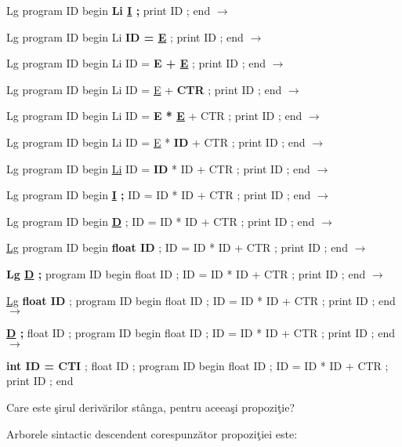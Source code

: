 Lg program ID begin \textbf{Li \underline{I} ;} print ID ; end $\rightarrow$

Lg program ID begin Li \textbf{ID = \underline{E}} ; print ID ; end $\rightarrow$

Lg program ID begin Li ID = \textbf{E + \underline{E}} ; print ID ; end $\rightarrow$

Lg program ID begin Li ID = \underline{E} + \textbf{CTR} ; print ID ; end $\rightarrow$

Lg program ID begin Li ID = \textbf{E * \underline{E}} + CTR ; print ID ; end $\rightarrow$

Lg program ID begin Li ID = \underline{E} * \textbf{ID} + CTR ; print ID ; end $\rightarrow$

Lg program ID begin \underline{Li} ID = \textbf{ID} * ID + CTR ; print ID ; end $\rightarrow$

Lg program ID begin \textbf{\underline{I} ;} ID = ID * ID + CTR ; print ID ; end $\rightarrow$

Lg program ID begin \textbf{\underline{D}} ; ID = ID * ID + CTR ; print ID ; end $\rightarrow$

\underline{Lg} program ID begin \textbf{float ID} ; ID = ID * ID + CTR ; print ID ; end $\rightarrow$

\textbf{Lg \underline{D} ;} program ID begin float ID ; ID = ID * ID + CTR ; print ID ; end $\rightarrow$

\underline{Lg} \textbf{float ID} ; program ID begin float ID ; ID = ID * ID + CTR ; print ID ; end $\rightarrow$

\textbf{\underline{D} ;} float ID ; program ID begin float ID ; ID = ID * ID + CTR ; print ID ; end $\rightarrow$

\textbf{int ID = CTI} ; float ID ; program ID begin float ID ; ID = ID * ID + CTR ; print ID ; end

Care este şirul derivărilor stânga, pentru aceeaşi propoziţie?

Arborele sintactic descendent corespunzător propoziţiei este:

